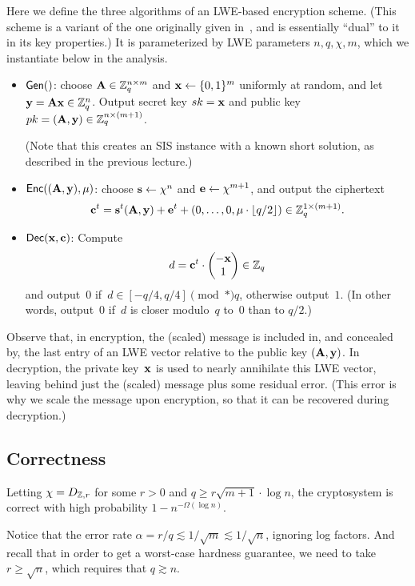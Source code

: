 \documentclass[11pt]{article}
\begin{document}
Here we define the three algorithms of an LWE-based encryption scheme.
(This scheme is a variant of the one originally given
in~\cite{DBLP:journals/jacm/Regev09}, and is essentially ``dual'' to
it in its key properties.) It is parameterized by LWE parameters
$n,q,\chi,m$, which we instantiate below in the analysis.
\begin{itemize}
\item $\mathsf{Gen}()$: choose $\mathbf{A} \in \mathbb{Z}_q^{n\times m}$ and
  $\mathbf{x} \leftarrow \{0,1\}^m$ uniformly at random, and let
  $\mathbf{y} = \mathbf{A} \mathbf{x} \in \mathbb{Z}_q^{n}$. Output secret key $sk = \mathbf{x}$
  and public key $pk = (\mathbf{A}, \mathbf{y}) \in \mathbb{Z}_q^{n \times (m+1)}$.

  (Note that this creates an SIS instance with a known short solution,
  as described in the previous lecture.)

\item $\mathsf{Enc}((\mathbf{A},\mathbf{y}),\mu)$: choose $\mathbf{s} \leftarrow \chi^n$
  and $\mathbf{e} \leftarrow \chi^{m+1}$, and output the ciphertext
  \[ \mathbf{c}^t = \mathbf{s}^t (\mathbf{A}, \mathbf{y}) + \mathbf{e}^t + (0,\ldots,0,\mu
    \cdot \lfloor q/2\rfloor) \in \mathbb{Z}_q^{1 \times (m+1)}. \]

\item $\mathsf{Dec}(\mathbf{x},\mathbf{c})$: Compute
  \[ d = \mathbf{c}^t \cdot
    \begin{pmatrix}
      -\mathbf{x} \\ 1
    \end{pmatrix} \in \mathbb{Z}_q
  \]
  and output~$0$ if~$d \in [-q/4, q/4] \pmod*{q}$, otherwise
  output~$1$. (In other words, output~$0$ if~$d$ is closer modulo~$q$
  to~$0$ than to $q/2$.)
\end{itemize}

Observe that, in encryption, the (scaled) message is included in, and
concealed by, the last entry of an LWE vector relative to the public
key $(\mathbf{A}, \mathbf{y})$. In decryption, the private key~$\mathbf{x}$ is used
to nearly annihilate this LWE vector, leaving behind just the (scaled)
message plus some residual error. (This error is why we scale the
message upon encryption, so that it can be recovered during
decryption.)

\subsection{Correctness}
\label{sec:correctness}

\begin{lemma}
  \label{lem:correct}
  Letting $\chi = D_{\mathbb{Z},r}$ for some $r > 0$ and
  $q \geq r \sqrt{m+1} \cdot \log n$, the cryptosystem is correct with
  high probability $1-n^{-\Omega(\log n)}$.
\end{lemma}
Notice that the error rate
$\alpha = r/q \lesssim 1/\sqrt{m} \lesssim 1/\sqrt{n}$, ignoring log
factors. And recall that in order to get a worst-case hardness
guarantee, we need to take $r \geq \sqrt{n}$, which requires that
$q \gtrsim n$.
\end{document}
